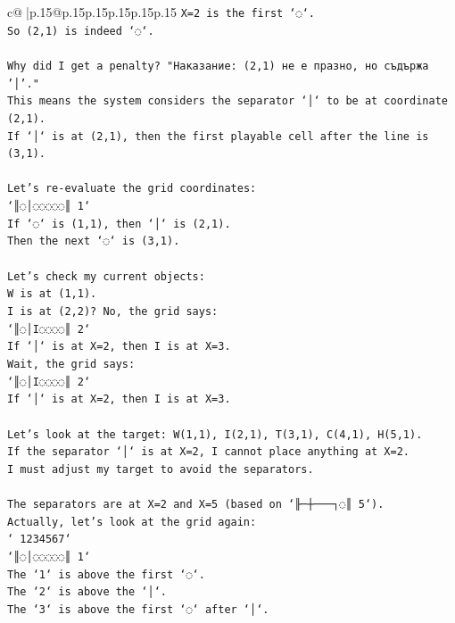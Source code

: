 \documentclass{article}
\begin{document}
{\begin{supertabular}{c@{$\;$}|p{.15\linewidth}@{}p{.15\linewidth}p{.15\linewidth}p{.15\linewidth}p{.15\linewidth}p{.15\linewidth}}
{{{\texttt{X=2 is the first `◌`.} \\
\texttt{So (2,1) is indeed `◌`.} \\
\\ 
\texttt{Why did I get a penalty? "Наказание: (2,1) не е празно, но съдържа '│'."} \\
\texttt{This means the system considers the separator `│` to be at coordinate (2,1).} \\
\texttt{If `│` is at (2,1), then the first playable cell after the line is (3,1).} \\
\\ 
\texttt{Let's re{-}evaluate the grid coordinates:} \\
\texttt{`║◌│◌◌◌◌◌║ 1`} \\
\texttt{If `◌` is (1,1), then `│` is (2,1).} \\
\texttt{Then the next `◌` is (3,1).} \\
\\ 
\texttt{Let's check my current objects:} \\
\texttt{W is at (1,1).} \\
\texttt{I is at (2,2)? No, the grid says:} \\
\texttt{`║◌│I◌◌◌◌║ 2`} \\
\texttt{If `│` is at X=2, then I is at X=3.} \\
\texttt{Wait, the grid says:} \\
\texttt{`║◌│I◌◌◌◌║ 2`} \\
\texttt{If `│` is at X=2, then I is at X=3.} \\
\\ 
\texttt{Let's look at the target: W(1,1), I(2,1), T(3,1), C(4,1), H(5,1).} \\
\texttt{If the separator `│` is at X=2, I cannot place anything at X=2.} \\
\texttt{I must adjust my target to avoid the separators.} \\
\\ 
\texttt{The separators are at X=2 and X=5 (based on `╟─┼───┐◌║ 5`).} \\
\texttt{Actually, let's look at the grid again:} \\
\texttt{` 1234567`} \\
\texttt{`║◌│◌◌◌◌◌║ 1`} \\
\texttt{The `1` is above the first `◌`.} \\
\texttt{The `2` is above the `│`.} \\
\texttt{The `3` is above the first `◌` after `│`.} \\
}}}
\end{supertabular}}
\end{document}
